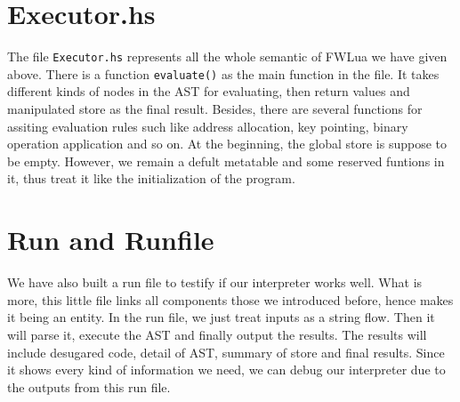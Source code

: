 \section{Executor.hs}
The file {\tt Executor.hs} represents all the whole semantic of FWLua we have given above. There is a function {\tt evaluate()} as the main function in the file. It takes different kinds of nodes in the AST for evaluating, then return values and manipulated store as the final result. Besides, there are several functions for assiting evaluation rules such like address allocation, key pointing, binary operation application and so on. At the beginning, the global store is suppose to be empty. However, we remain a defult metatable and some reserved funtions in it, thus treat it like the initialization of the program.

\section{Run and Runfile}
We have also built a run file to testify if our interpreter works well. What is more, this little file links all components those we introduced before, hence makes it being an entity. In the run file, we just treat inputs as a string flow. Then it will parse it, execute the AST and finally output the results. The results will include desugared code, detail of AST, summary of store and final results. Since it shows every kind of information we need, we can debug our interpreter due to the outputs from this run file.